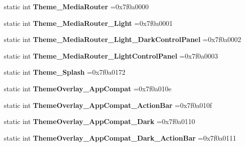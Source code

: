\begin{DoxyCompactItemize}
static int {\bfseries Theme\+\_\+\+Media\+Router} =0x7f0a0000
\item 
\mbox{\label{classandroid_1_1support_1_1v4_1_1R_1_1style_ad1048b15d818bff233840e28fe057242}} 
static int {\bfseries Theme\+\_\+\+Media\+Router\+\_\+\+Light} =0x7f0a0001
\item 
\mbox{\label{classandroid_1_1support_1_1v4_1_1R_1_1style_a812317ae054630d2f9a496827ba9c46b}} 
static int {\bfseries Theme\+\_\+\+Media\+Router\+\_\+\+Light\+\_\+\+Dark\+Control\+Panel} =0x7f0a0002
\item 
\mbox{\label{classandroid_1_1support_1_1v4_1_1R_1_1style_a179a4612f33db67f45461158df8cf09d}} 
static int {\bfseries Theme\+\_\+\+Media\+Router\+\_\+\+Light\+Control\+Panel} =0x7f0a0003
\item 
\mbox{\label{classandroid_1_1support_1_1v4_1_1R_1_1style_a85ad61ec18fd25040d80a895f2191502}} 
static int {\bfseries Theme\+\_\+\+Splash} =0x7f0a0172
\item 
\mbox{\label{classandroid_1_1support_1_1v4_1_1R_1_1style_a721a0cf85cbb9a1a4b92ea2810e7673a}} 
static int {\bfseries Theme\+Overlay\+\_\+\+App\+Compat} =0x7f0a010e
\item 
\mbox{\label{classandroid_1_1support_1_1v4_1_1R_1_1style_a147b6c357e8660f0eac587604e5aadde}} 
static int {\bfseries Theme\+Overlay\+\_\+\+App\+Compat\+\_\+\+Action\+Bar} =0x7f0a010f
\item 
\mbox{\label{classandroid_1_1support_1_1v4_1_1R_1_1style_ac2be67be545c4f3a9472ed456e2590e4}} 
static int {\bfseries Theme\+Overlay\+\_\+\+App\+Compat\+\_\+\+Dark} =0x7f0a0110
\item 
\mbox{\label{classandroid_1_1support_1_1v4_1_1R_1_1style_a48af43da12196880628b1c67e7994f7c}} 
static int {\bfseries Theme\+Overlay\+\_\+\+App\+Compat\+\_\+\+Dark\+\_\+\+Action\+Bar} =0x7f0a0111
\item 

\end{DoxyCompactItemize}
